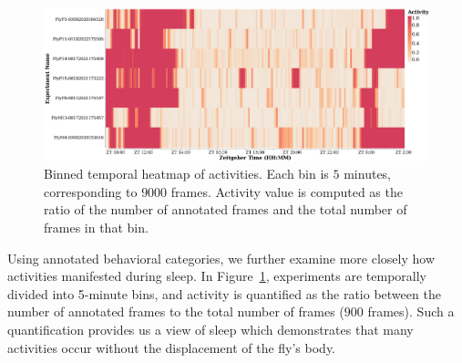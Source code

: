 \begin{figure}[htb!]
	\centering\includegraphics[width=0.995\linewidth]{figures/ActivityBinned-Ann-WT-5T.pdf}
	\caption[Binned temporal heatmap of activities.]{Binned temporal heatmap of activities.
		Each bin is $5$ minutes, corresponding to $9000$ frames.
		Activity value is computed as the ratio of the number of annotated frames and the total number of frames in that bin. \label{figure:heatmap-microactivity}}
\end{figure}

Using annotated behavioral categories, we further examine more closely how activities manifested during sleep.
In Figure~\ref{figure:heatmap-microactivity}, experiments are temporally divided into 5-minute bins, and activity is quantified as the ratio between the number of annotated frames to the total number of frames ($900$ frames). Such a quantification provides us a view of sleep which demonstrates that many activities occur without the displacement of the fly's body.

